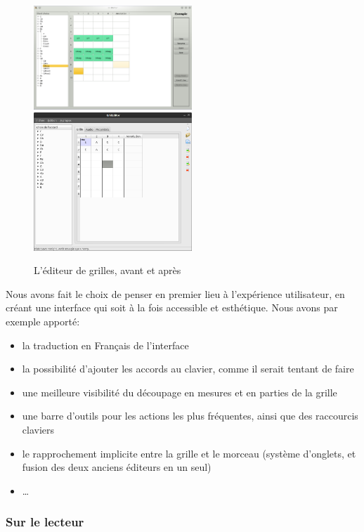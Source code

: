 \documentclass[a4paper,11pt]{article}
\begin{document}
\begin{figure}[H]
\begin{center}
\includegraphics[width=225px]{ancien_editeur.png}
\includegraphics[width=225px]{nouveau_editeur.png}
\caption{L'éditeur de grilles, avant et après}
\label{av_ap_editeur}
\end{center}
\end{figure}

Nous avons fait le choix de penser en premier lieu à l'expérience utilisateur, en créant une interface qui soit à la fois accessible et esthétique. Nous avons par exemple apporté:
\begin{itemize}
 \item la traduction en Français de l'interface
 \item la possibilité d'ajouter les accords au clavier, comme il serait tentant de faire
 \item une meilleure visibilité du découpage en mesures et en parties de la grille
 \item une barre d'outils pour les actions les plus fréquentes, ainsi que des raccourcis claviers
 \item le rapprochement implicite entre la grille et le morceau (système d'onglets, et fusion des deux anciens éditeurs en un seul)
 \item \dots
\end{itemize}

\subsubsection{Sur le lecteur}
\end{document}
